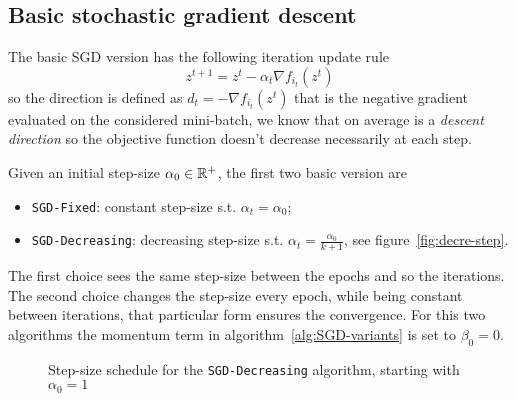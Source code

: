 


\subsection{Basic stochastic gradient descent}\label{subsc:sgd}

The basic SGD version has the following iteration update rule
\begin{equation}\label{eq:sgd-base}
z^{t+1}=z^t-\alpha_t\nabla f_{i_t}(z^t)
\end{equation}
so the direction is defined as $d_t=-\nabla f_{i_t}(z^t)$ that is the negative gradient evaluated on the considered mini-batch, we know that on average is a \emph{descent direction} so the objective function doesn't decrease necessarily at each step.

Given an initial step-size $\alpha_0\in\mathbb{R}^+$, the first two basic version are 
\begin{itemize}
\item \texttt{SGD-Fixed}: constant step-size s.t. $\alpha_t=\alpha_0$;
\item \texttt{SGD-Decreasing}: decreasing step-size s.t. $\alpha_t=\frac{\alpha_0}{k+1}$, see figure~\vref{fig:decre-step}.
\end{itemize}
The first choice sees the same step-size between the epochs and so the iterations. The second choice changes the step-size every epoch, while being constant between iterations, that particular form ensures the convergence. For this two algorithms the momentum term in algorithm~\ref{alg:SGD-variants} is set to $\beta_0=0$.

\begin{figure}
\centering
{}
\caption{Step-size schedule for the \texttt{SGD-Decreasing} algorithm, starting with $\alpha_0=1$}
\label{fig:decre-step}
\end{figure}

